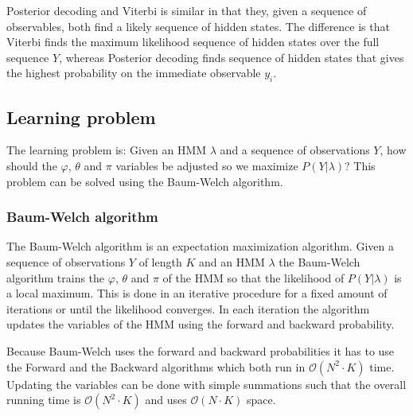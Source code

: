 

Posterior decoding and Viterbi is similar in that they, given a sequence of observables, both find a likely sequence of hidden states. The difference is that Viterbi finds the maximum likelihood sequence of hidden states over the full sequence $Y$, whereas Posterior decoding finds sequence of hidden states that gives the highest probability on the immediate observable $y_i$.

\subsection{Learning problem}

The learning problem is: Given an HMM $\lambda$ and a sequence of observations $Y$, how should the $\varphi$, $\theta$ and $\pi$ variables be adjusted so we maximize $P(Y|\lambda)$? This problem can be solved using the Baum-Welch algorithm.

\subsubsection{Baum-Welch algorithm}


The Baum-Welch \cite{Bishop} algorithm is an expectation maximization algorithm. Given a sequence of observations $Y$ of length $K$ and an HMM $\lambda$ the Baum-Welch algorithm trains the $\varphi$, $\theta$ and $\pi$ of the HMM so that the likelihood of $P(Y|\lambda)$ is a local maximum. This is done in an iterative procedure for a fixed amount of iterations or until the likelihood converges. In each iteration the algorithm updates the variables of the HMM using the forward and backward probability.

Because Baum-Welch uses the forward and backward probabilities it has to use the Forward and the Backward algorithms which both run in $\mathcal{O}( N ^2\cdot K)$ time. Updating the variables can be done with simple summations such that the overall running time is $\mathcal{O}( N ^2\cdot K)$ and uses $\mathcal{O}( N \cdot K)$ space.
